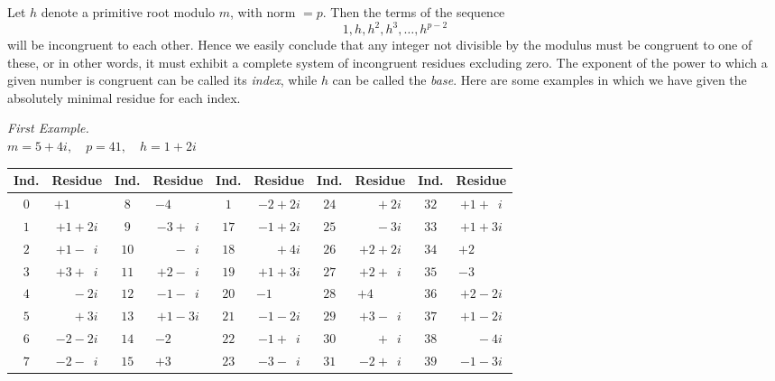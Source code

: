 \documentclass[twoside,12pt]{memoir}
\begin{document}
Let \(h\) denote a primitive root modulo \(m\), with norm \(=p\).  Then the terms of the sequence
\[1, h, h^{2}, h^{3}, \ldots, h^{p-2}\]
will be incongruent to each other. Hence we easily conclude that any integer not divisible by the modulus must be congruent to one of these, or in other words, it must exhibit a complete system of incongruent residues excluding zero. The exponent of the power to which a given number is congruent can be called its \textit{index}, while \(h\) can be called the \textit{base}. Here are some examples in which we have given the absolutely minimal residue for each index.
\begin{center}
\textit{First Example.}\\
\(m=5+4 i, \quad p=41, \quad h=1+2 i\)\\
\begin{tabular}{c|c||c|c||c|c||c|c||c|c}
Ind. & Residue & Ind. &Residue & Ind. & Residue & Ind. & Residue & Ind. & Residue \\
\hline
\(0\) & \(+1\phantom{\;+0i}\) & \(8\) & \(-4\phantom{\;+0i}\) & \(1 \)& \(-2+2 i\) & \(24\) & \(\phantom{+0}+2 i\) & \(32 \)& \(+1+\phantom{1}i\) \\
\(1\) & \(+1+2 i\) & \(9\) & \(-3+\phantom{1}i\) & \(17\) & \(-1+2 i\) & \(25\) & \(\phantom{+0}-3 i\) & \(33\) & \(+1+3 i\) \\
\(2\) & \(+1-\phantom{1}i\) & \(10\) & \(\phantom{+0}-\phantom{1}i\) & \(18\) & \(\phantom{+0}+4 i\) & \(26\) & \(+2+2 i\) & \(34\) & \(+2\phantom{\;+0i}\) \\
\(3\) & \(+3+\phantom{1}i\) & \(11\) & \(+2-\phantom{1}i\) & \(19\) & \(+1+3 i\) & \(27\) & \(+2+\phantom{1}i\) & \(35\) & \(-3\phantom{\;+0i}\)\\
\(4\) & \(\phantom{+0}-2 i\) & \(12\) & \(-1-\phantom{1}i\) & \(20\) & \(-1\phantom{\;+0i}\) & \(28\) & \(+4\phantom{\;+0i}\) & \(36\) & \(+2-2 i\) \\
\(5\) & \(\phantom{+0}+3 i\) & \(13\) & \(+1-3 i\) & \(21\) & \(-1-2 i\) & \(29\) & \(+3-\phantom{1}i\) & \(37\) & \(+1-2 i\) \\
\(6\) & \(-2-2 i\) & \(14\) & \(-2\phantom{\;+0i}\) & \(22\) & \(-1+\phantom{1}i\) & \(30\) & \(\phantom{+0}+\phantom{1}i\) & \(38\) & \(\phantom{+0}-4 i\) \\
\(7\) & \(-2-\phantom{1}i\) & \(15\) & \(+3\phantom{\;+0i}\) & \(23\) & \(-3-\phantom{1}i\) & \(31\) & \(-2+\phantom{1}i\) & \(39\) & \(-1-3 i\) \\
\end{tabular}
\end{center}
%
\end{document}
